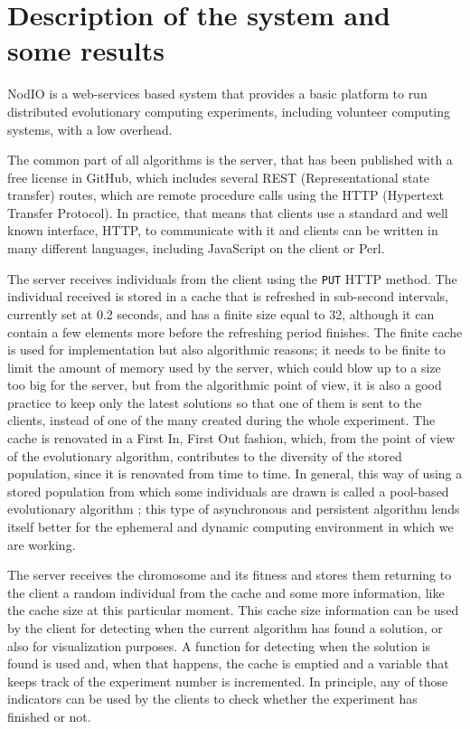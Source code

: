 \documentclass{sig-alternate}
\begin{document}
\section{Description of the system and some results}
\label{sec:res}

NodIO \cite{2016arXiv160101607M,DBLP:conf/gecco/GuervosG15} is a
web-services based system that provides a basic platform to run distributed evolutionary
computing experiments, including volunteer computing systems, with a
low overhead.  

The common part of all algorithms is the server, that has been
published with a free license in GitHub, which includes several REST
(Representational state transfer)
routes, which are remote procedure calls using the HTTP (Hypertext
Transfer Protocol). In practice, that means that clients use a
standard and well known interface, HTTP, to communicate with it and
clients can be written in many different languages, including
JavaScript on the client  or Perl. 

The server receives individuals from the client using the {\tt PUT}
HTTP method. The individual received is stored in a cache that is
refreshed in sub-second intervals, currently set at 0.2 seconds, and
has a finite size equal to 32, although it can contain a few elements
more before the refreshing period finishes. The finite cache is used
for implementation but also algorithmic reasons; it needs to be finite
to limit the amount of memory used by the server, which could blow up
to a size too big for the server, but from the algorithmic point of
view, it is also  a good practice to keep only the latest solutions so
that one of them is sent to the clients, instead of one of the many created
during the whole experiment. 
The cache is renovated in a First
In, First Out fashion, which, from the point of view of the
evolutionary algorithm, contributes to the diversity of the stored
population, since it is renovated from time to time. In general, this way of using a stored population from
which some individuals are drawn is called a pool-based evolutionary
algorithm
\cite{pool:ga,bollini1999distributed,gong2015distributed,
  sofea:evopar2012,DBLP:journals/grid/ValdezTGVO15,garcia2014unreliable,LNCS86720702,
  DBLP:conf/3pgcic/GuervosMFEL12,sofea:naco}; this type of
asynchronous and persistent algorithm lends itself better for the
ephemeral and dynamic computing environment in which we are
working. 

The server receives the chromosome and its fitness and
 stores them returning to the client a random individual from the
cache and some more information, like the cache size at this
particular moment. This cache size information can be used by the
client for detecting when the current algorithm has found a solution,
or also for visualization purposes. A function for detecting when the
solution is found is used and, when that happens, the cache is emptied
and a variable that keeps track of the experiment number is
incremented. In principle, any of those indicators can be used by the
clients to check whether the experiment has finished or not. 
\end{document}

